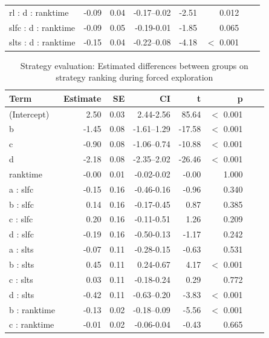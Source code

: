 \documentclass[pdflatex,sn-mathphys-num]{sn-jnl}%
\theoremstyle{thmstyleone}%
\theoremstyle{thmstyletwo}%
\theoremstyle{thmstylethree}%
\begin{document}
\begin{appendices}
\begin{table}[h!]
\begin{tabular}{lrrrrrrr}
  rl : d : ranktime & -0.09 & 0.04 & -0.17--0.02 & -2.51 &    0.012 \\ 
  slfc : d : ranktime & -0.09 & 0.05 & -0.19-0.01 & -1.85 &    0.065 \\ 
  slts : d : ranktime & -0.15 & 0.04 & -0.22--0.08 & -4.18 &  $<$  0.001 \\ 
   \hline
\end{tabular}
\end{table}


\begin{table}[h!]
\caption{Strategy evaluation: Estimated differences between groups on strategy ranking during forced exploration}\label{table_strategyevaluation_diffgroup}
\centering
\begin{tabular}{lrrrrrrr}
  \hline
 Term & Estimate & SE & CI & t & p \\ 
  \hline
 (Intercept) & 2.50 & 0.03 & 2.44-2.56 & 85.64 &  $<$  0.001 \\ 
   b & -1.45 & 0.08 & -1.61--1.29 & -17.58 &  $<$  0.001 \\ 
   c & -0.90 & 0.08 & -1.06--0.74 & -10.88 &  $<$  0.001 \\ 
   d & -2.18 & 0.08 & -2.35--2.02 & -26.46 &  $<$  0.001 \\ 
   ranktime & -0.00 & 0.01 & -0.02-0.02 & -0.00 &    1.000 \\ 
   a : slfc & -0.15 & 0.16 & -0.46-0.16 & -0.96 &    0.340 \\ 
   b : slfc & 0.14 & 0.16 & -0.17-0.45 & 0.87 &    0.385 \\ 
   c : slfc & 0.20 & 0.16 & -0.11-0.51 & 1.26 &    0.209 \\ 
   d : slfc & -0.19 & 0.16 & -0.50-0.13 & -1.17 &    0.242 \\ 
   a : slts & -0.07 & 0.11 & -0.28-0.15 & -0.63 &    0.531 \\ 
   b : slts & 0.45 & 0.11 & 0.24-0.67 & 4.17 &  $<$  0.001 \\ 
   c : slts & 0.03 & 0.11 & -0.18-0.24 & 0.29 &    0.772 \\ 
   d : slts & -0.42 & 0.11 & -0.63--0.20 & -3.83 &  $<$  0.001 \\ 
   b : ranktime & -0.13 & 0.02 & -0.18--0.09 & -5.56 &  $<$  0.001 \\ 
   c : ranktime & -0.01 & 0.02 & -0.06-0.04 & -0.43 &    0.665 \\ 

\end{tabular}
\end{table}
\end{appendices}
\end{document}
